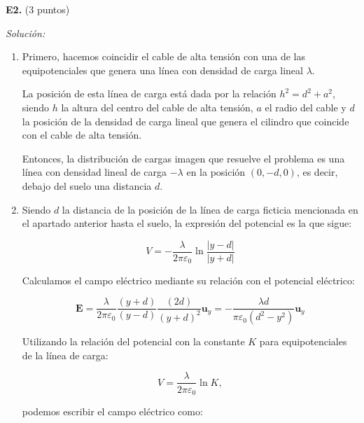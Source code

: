 \textbf{E2.} (3 puntos)


\vspace{20px}
\textit{Solución:}
\\

\begin{enumerate}
[label=\alph*)]
    \item Primero, hacemos coincidir el cable de alta tensión con una de las equipotenciales que genera una línea con densidad de carga
    lineal $\lambda$.

    La posición de esta línea de carga está dada por la relación $h^2 = d^2 + a^2$, siendo $h$ la altura del centro del cable de alta tensión, $a$ el radio del
    cable y $d$ la posición de la densidad de carga lineal que genera el cilindro que coincide con el cable de alta tensión.

    Entonces, la distribución de cargas imagen que resuelve el problema es una línea con densidad lineal de carga $-\lambda$ en la posición $(0, -d, 0)$, es
    decir, debajo del suelo una distancia $d$.

    \vspace{20px}

    \item Siendo $d$ la distancia de la posición de la línea de carga ficticia mencionada en el apartado anterior hasta el suelo, la expresión del potencial es
    la que sigue:

    \begin{equation*}
        V = - \frac{\lambda}{2\pi\varepsilon_0} \ln{\frac{|y - d|}{|y+d|}}
    \end{equation*}

    Calculamos el campo eléctrico mediante su relación con el potencial eléctrico:

    \begin{equation*}
        \textbf{E} = \frac{\lambda}{2\pi\varepsilon_0} \frac{(y+d)}{(y-d)} \frac{(2d)}{(y+d)^2} \textbf{u}_y
        = - \frac{\lambda d}{\pi \varepsilon_0 (d^2 - y^2)}  \textbf{u}_y
    \end{equation*}

    Utilizando la relación del potencial con la constante $K$ para equipotenciales de la línea de carga:

    \begin{equation*}
        V = \frac{\lambda}{2\pi\varepsilon_0} \ln{K},
    \end{equation*}

    podemos escribir el campo eléctrico como:


\end{enumerate}
